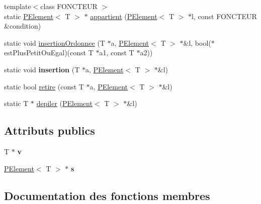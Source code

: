 \begin{DoxyCompactItemize}
\item 
{\footnotesize template$<$class F\+O\+N\+C\+T\+E\+UR $>$ }\\static \mbox{\hyperlink{class_p_element}{P\+Element}}$<$ T $>$ $\ast$ \mbox{\hyperlink{class_p_element_ad1ad40db30605db39a57c08058cf444c}{appartient}} (\mbox{\hyperlink{class_p_element}{P\+Element}}$<$ T $>$ $\ast$l, const F\+O\+N\+C\+T\+E\+UR \&condition)
\item 
static void \mbox{\hyperlink{class_p_element_a0e32256cbecaea72487f347763b38d57}{insertion\+Ordonnee}} (T $\ast$a, \mbox{\hyperlink{class_p_element}{P\+Element}}$<$ T $>$ $\ast$\&l, bool($\ast$est\+Plus\+Petit\+Ou\+Egal)(const T $\ast$a1, const T $\ast$a2))
\item 
\mbox{\label{class_p_element_a9ae596a40769fc8c75a673fe5388cbc9}} 
static void {\bfseries insertion} (T $\ast$a, \mbox{\hyperlink{class_p_element}{P\+Element}}$<$ T $>$ $\ast$\&l)
\item 
static bool \mbox{\hyperlink{class_p_element_aa9bb67abf314148c1ecdb83e16c9c16d}{retire}} (const T $\ast$a, \mbox{\hyperlink{class_p_element}{P\+Element}}$<$ T $>$ $\ast$\&l)
\item 
static T $\ast$ \mbox{\hyperlink{class_p_element_a64309fcc01ade68603bf85c7dbb04c95}{depiler}} (\mbox{\hyperlink{class_p_element}{P\+Element}}$<$ T $>$ $\ast$\&l)
\end{DoxyCompactItemize}
\subsection*{Attributs publics}
\begin{DoxyCompactItemize}
\item 
\mbox{\label{class_p_element_ab406d2871111fe1fa983b58d4522502d}} 
T $\ast$ {\bfseries v}
\item 
\mbox{\label{class_p_element_a8df72226902275db0b92d344b0564df5}} 
\mbox{\hyperlink{class_p_element}{P\+Element}}$<$ T $>$ $\ast$ {\bfseries s}
\end{DoxyCompactItemize}


\subsection{Documentation des fonctions membres}
\mbox{\label{class_p_element_aee7ccc9dcc49558af92960dd60fafc9d}} 
